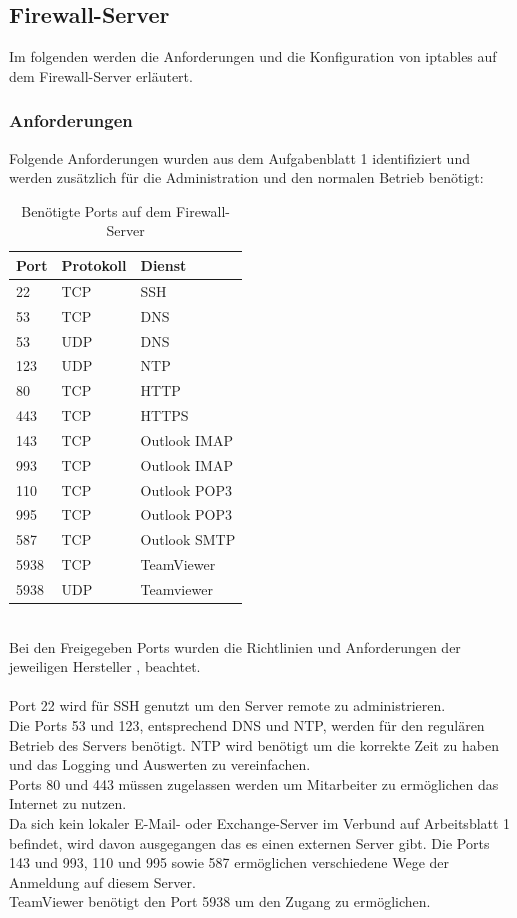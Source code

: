 \documentclass[
    a4paper,
    pagesize,
	pdftex,
    12pt,
]{scrartcl}
\begin{document}
\subsection{Firewall-Server}\label{config-firewall-fw}
Im folgenden werden die Anforderungen und die Konfiguration von iptables auf dem Firewall-Server erläutert.

\subsubsection{Anforderungen}
Folgende Anforderungen wurden aus dem Aufgabenblatt 1 identifiziert und werden zusätzlich für die Administration und den normalen Betrieb benötigt:
\begin{table}[h!]
	\begin{center}
		\label{tab:table3}
		\begin{tabular}{l|l |l }
			\textbf{Port} & \textbf{Protokoll} & \textbf{Dienst} \\
			\hline
			22 & TCP & SSH \\
			53 & TCP & DNS \\
			53 & UDP & DNS \\
			123 & UDP & NTP \\
			80 & TCP & HTTP \\
			443 & TCP & HTTPS \\
			143 & TCP & Outlook IMAP \\
			993 & TCP & Outlook IMAP \\
			110 & TCP & Outlook POP3 \\
			995 & TCP & Outlook POP3 \\
			587 & TCP & Outlook SMTP \\
			5938 & TCP & TeamViewer \\
			5938 & UDP & Teamviewer \\
		\end{tabular}
		\caption{Benötigte Ports auf dem Firewall-Server}
	\end{center}
\end{table}
\\
Bei den Freigegeben Ports wurden die Richtlinien und Anforderungen der jeweiligen Hersteller \cite{ashaiyengar-2023}, \cite{teamviewer-2024} beachtet. \\ \\
Port 22 wird für SSH genutzt um den Server remote zu administrieren. \\
Die Ports 53 und 123, entsprechend DNS und NTP, werden für den regulären Betrieb des Servers benötigt. NTP wird benötigt um die korrekte Zeit zu haben und das Logging und Auswerten zu vereinfachen. \\
Ports 80 und 443 müssen zugelassen werden um Mitarbeiter zu ermöglichen das Internet zu nutzen. \\
Da sich kein lokaler E-Mail- oder Exchange-Server im Verbund auf Arbeitsblatt 1 befindet, wird davon ausgegangen das es einen externen Server gibt. Die Ports 143 und 993, 110 und 995 sowie 587 ermöglichen verschiedene Wege der Anmeldung auf diesem Server. \\
TeamViewer benötigt den Port 5938 um den Zugang zu ermöglichen.
\end{document}
